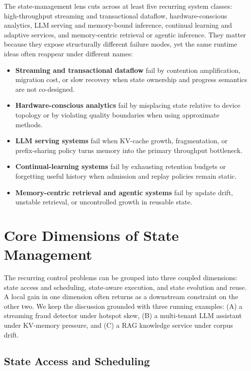 \documentclass[manuscript]{acmart}
\begin{document}
The state-management lens cuts across at least five recurring system classes: high-throughput streaming and transactional dataflow, hardware-conscious analytics, LLM serving and memory-bound inference, continual learning and adaptive services, and memory-centric retrieval or agentic inference. They matter because they expose structurally different failure modes, yet the same runtime ideas often reappear under different names:
\begin{itemize}[leftmargin=*]
\item \textbf{Streaming and transactional dataflow} fail by contention amplification, migration cost, or slow recovery when state ownership and progress semantics are not co-designed.
\item \textbf{Hardware-conscious analytics} fail by misplacing state relative to device topology or by violating quality boundaries when using approximate methods.
\item \textbf{LLM serving systems} fail when KV-cache growth, fragmentation, or prefix-sharing policy turns memory into the primary throughput bottleneck.
\item \textbf{Continual-learning systems} fail by exhausting retention budgets or forgetting useful history when admission and replay policies remain static.
\item \textbf{Memory-centric retrieval and agentic systems} fail by update drift, unstable retrieval, or uncontrolled growth in reusable state.
\end{itemize}

\section{Core Dimensions of State Management}
\label{sec:core-dimensions}

The recurring control problems can be grouped into three coupled dimensions: state access and scheduling, state-aware execution, and state evolution and reuse. A local gain in one dimension often returns as a downstream constraint on the other two. We keep the discussion grounded with three running examples: (A) a streaming fraud detector under hotspot skew, (B) a multi-tenant LLM assistant under KV-memory pressure, and (C) a RAG knowledge service under corpus drift.

\subsection{State Access and Scheduling}
\end{document}
